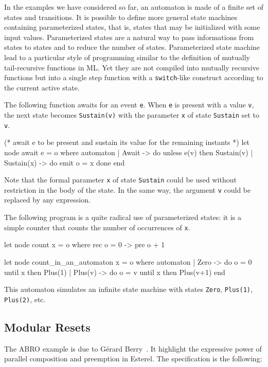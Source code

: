 \documentclass[11pt,titlepage,twoside]{report}
\begin{document}
In the examples we have considered so far, an automaton is made of a
finite set of states and transitions. It is possible to define more
general state machines containing parameterized states, that is,
states that may be initialized with some input values. Parameterized
states are a natural way to pass informations from states to states
and to reduce the number of states. Parameterized state machine
lead to a particular style of programming similar to the
definition of mutually tail-recursive functions in ML. Yet they are not
compiled into mutually recursive functions but into a single step
function with a \texttt{switch}-like construct according to the current
active state.

The following function awaits for an event \texttt{e}. When \texttt{e} is present with
a value \texttt{v}, the next state becomes \texttt{Sustain(v)} with the parameter
\texttt{x} of state \texttt{Sustain} set to \texttt{v}.
\begin{chklisting}[withresult,label=await]
(* await e to be present and sustain its value for the remaining instants *)
let node await e = o where 
  automaton
  | Await -> do unless e(v) then Sustain(v)
  | Sustain(x) -> do emit o = x done
  end
\end{chklisting}

Note that the formal parameter \verb-x- of state \verb-Sustain- could
be used without restriction in the body of the state. In the same way, the
argument \verb-v- could be replaced by any expression.

\medskip
The following program is a quite radical use of parameterized states: it
is a simple counter that counts the number of
occurrences of \verb-x-.
\begin{chklisting}[withresult]
let node count x = o where rec o = 0 -> pre o + 1

let node count_in_an_automaton x = o where
  automaton
  | Zero -> do o = 0 until x then Plus(1)
  | Plus(v) -> do o = v until x then Plus(v+1)
  end
\end{chklisting}

This automaton simulates an infinite state machine with states
\verb-Zero-, \verb-Plus(1)-, \verb-Plus(2)-, etc.

\subsection{Modular Resets\label{resets}} %

The ABRO example is due to G\'erard Berry~\cite{esterel:primer99}. It
highlight the expressive power of parallel composition and preemption
in Esterel. The specification is the following:
\end{document}
